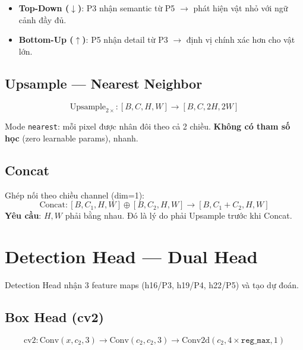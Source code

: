 \begin{notebox}
\begin{itemize}
    \item \textbf{Top-Down ($\downarrow$)}: P3 nhận semantic từ P5 $\to$ phát hiện vật nhỏ với ngữ cảnh đầy đủ.
    \item \textbf{Bottom-Up ($\uparrow$)}: P5 nhận detail từ P3 $\to$ định vị chính xác hơn cho vật lớn.
\end{itemize}
\end{notebox}

\subsection{Upsample --- Nearest Neighbor}

\begin{equation}
    \text{Upsample}_{2\times}: [B, C, H, W] \to [B, C, 2H, 2W]
\end{equation}

Mode \texttt{nearest}: mỗi pixel được nhân đôi theo cả 2 chiều. \textbf{Không có tham số học} (zero learnable params), nhanh.

\subsection{Concat}

Ghép nối theo chiều channel (dim=1):
\begin{equation}
    \text{Concat}: [B, C_1, H, W] \oplus [B, C_2, H, W] \to [B, C_1+C_2, H, W]
\end{equation}
\textbf{Yêu cầu}: $H, W$ phải bằng nhau. Đó là lý do phải Upsample trước khi Concat.

\section{Detection Head --- Dual Head}
\label{sec:detect_head}

Detection Head nhận 3 feature maps (h16/P3, h19/P4, h22/P5) và tạo dự đoán.

\subsection{Box Head (cv2)}

\begin{equation}
    \text{cv2}: \text{Conv}(x, c_2, 3) \to \text{Conv}(c_2, c_2, 3) \to \text{Conv2d}(c_2, 4 \times \texttt{reg\_max}, 1)
\end{equation}

